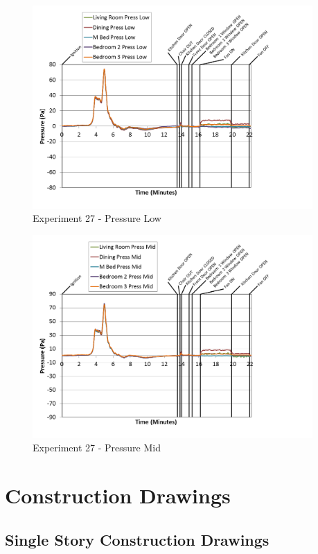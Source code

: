 \documentclass{article}
\begin{document}
\begin{appendices}
\clearpage

\begin{figure}[h!]
	\centering
	\includegraphics[height=3.05in]{0_Images/Results_Charts/Exp_27_Charts/PressureLow.png}
	\caption{Experiment 27 - Pressure Low}
\end{figure}


\begin{figure}[h!]
	\centering
	\includegraphics[height=3.05in]{0_Images/Results_Charts/Exp_27_Charts/PressureMid.png}
	\caption{Experiment 27 - Pressure Mid}
\end{figure}

\clearpage

\section{Construction Drawings} \label{App:ConstructionDrawings}

\clearpage

\subsection{Single Story Construction Drawings}


\end{appendices}
\end{document}
